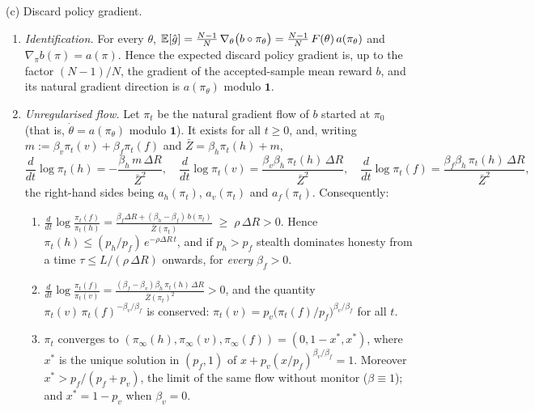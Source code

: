 \begin{theorem}
\smallskip\noindent\textup{(c) Discard policy gradient.}
\begin{enumerate}
\item[\textup{(c1)}] \emph{Identification.} For every $\theta$,
$\mathbb{E}[\hat g]=\frac{N-1}{N}\,\nabla_\theta\bigl(b\circ\pi_\theta\bigr)
=\frac{N-1}{N}\,F(\theta)\,a(\pi_\theta)$ and $\nabla_\pi b(\pi)=a(\pi)$.
Hence the expected discard policy gradient is, up to the factor $(N-1)/N$,
the gradient of the accepted-sample mean reward $b$, and its natural
gradient direction is $a(\pi_\theta)$ modulo $\mathbf 1$.
\item[\textup{(c2)}] \emph{Unregularised flow.} Let $\pi_t$ be the natural
gradient flow of $b$ started at $\pi_0$ (that is, $\dot\theta=a(\pi_\theta)$
modulo $\mathbf 1$). It exists for all $t\ge0$, and, writing
$m:=\beta_v\pi_t(v)+\beta_f\pi_t(f)$ and $\bar Z=\beta_h\pi_t(h)+m$,
\begin{equation}\label{eq:discard-a}
\frac{d}{dt}\log\pi_t(h)=-\frac{\beta_h\,m\,\Delta R}{\bar Z^{2}},\quad
\frac{d}{dt}\log\pi_t(v)=\frac{\beta_v\beta_h\,\pi_t(h)\,\Delta R}{\bar Z^{2}},\quad
\frac{d}{dt}\log\pi_t(f)=\frac{\beta_f\beta_h\,\pi_t(h)\,\Delta R}{\bar Z^{2}} ,
\end{equation}
the right-hand sides being $a_h(\pi_t)$, $a_v(\pi_t)$ and $a_f(\pi_t)$.
Consequently:
\begin{enumerate}
\item[\textup{(i)}] $\displaystyle\frac{d}{dt}\log\frac{\pi_t(f)}{\pi_t(h)}
=\frac{\beta_f\Delta R+(\beta_h-\beta_f)\,b(\pi_t)}{\bar Z(\pi_t)}
\;\ge\;\rho\,\Delta R>0$. Hence
$\pi_t(h)\le (p_h/p_f)\,e^{-\rho\Delta R\,t}$, and if $p_h>p_f$ stealth
dominates honesty from a time $\tau\le L/(\rho\,\Delta R)$ onwards, for
\emph{every} $\beta_f>0$.
\item[\textup{(ii)}] $\displaystyle\frac{d}{dt}\log\frac{\pi_t(f)}{\pi_t(v)}
=\frac{(\beta_f-\beta_v)\beta_h\,\pi_t(h)\,\Delta R}{\bar Z(\pi_t)^{2}}>0$,
and the quantity $\pi_t(v)\,\pi_t(f)^{-\beta_v/\beta_f}$ is conserved:
$\pi_t(v)=p_v\bigl(\pi_t(f)/p_f\bigr)^{\beta_v/\beta_f}$ for all $t$.
\item[\textup{(iii)}] $\pi_t$ converges to $(\pi_\infty(h),\pi_\infty(v),\pi_\infty(f))=(0,1-x^\ast,x^\ast)$,
where $x^\ast$ is the unique solution in $(p_f,1)$ of
$x+p_v(x/p_f)^{\beta_v/\beta_f}=1$. Moreover
$x^\ast>p_f/(p_f+p_v)$, the limit of the same flow without monitor
($\beta\equiv1$); and $x^\ast=1-p_v$ when $\beta_v=0$.
\end{enumerate}
\end{enumerate}
\end{theorem}

